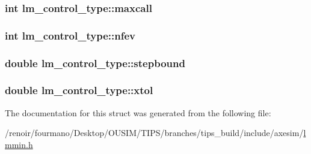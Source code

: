 \label{structlm__control__type_a8861cf59bcef801a964cea58a6391297}
\hypertarget{structlm__control__type_ab4ae043d134b2aed42e7f582a5477ccd}{
\subsubsection[{maxcall}]{\setlength{\rightskip}{0pt plus 5cm}int {\bf lm\_\-control\_\-type::maxcall}}}
\label{structlm__control__type_ab4ae043d134b2aed42e7f582a5477ccd}
\hypertarget{structlm__control__type_ae4655b72dafdecff2d201b37db99a30d}{
\subsubsection[{nfev}]{\setlength{\rightskip}{0pt plus 5cm}int {\bf lm\_\-control\_\-type::nfev}}}
\label{structlm__control__type_ae4655b72dafdecff2d201b37db99a30d}
\hypertarget{structlm__control__type_ac9780bfca8d97b88914ee2cbcad2c1e4}{
\subsubsection[{stepbound}]{\setlength{\rightskip}{0pt plus 5cm}double {\bf lm\_\-control\_\-type::stepbound}}}
\label{structlm__control__type_ac9780bfca8d97b88914ee2cbcad2c1e4}
\hypertarget{structlm__control__type_af9d44a57a447e2c06ba3d46a489add1f}{
\subsubsection[{xtol}]{\setlength{\rightskip}{0pt plus 5cm}double {\bf lm\_\-control\_\-type::xtol}}}
\label{structlm__control__type_af9d44a57a447e2c06ba3d46a489add1f}


The documentation for this struct was generated from the following file:\begin{DoxyCompactItemize}
\item 
/renoir/fourmano/Desktop/OUSIM/TIPS/branches/tips\_\-build/include/axesim/\hyperlink{lmmin_8h}{lmmin.h}\end{DoxyCompactItemize}
